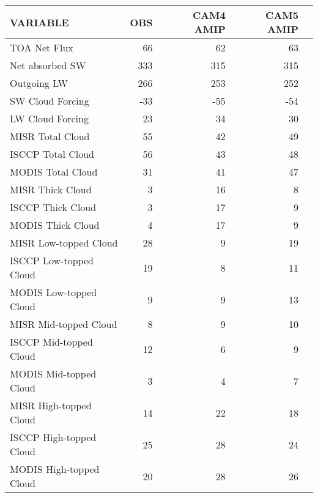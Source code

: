 \begin{tabular}{lrrrr}
\hline
                VARIABLE &                      OBS &                CAM4 AMIP &                CAM5 AMIP \\ \hline
            TOA Net Flux &                       66 &                       62 &                       63 \\
         Net absorbed SW &                      333 &                      315 &                      315 \\
             Outgoing LW &                      266 &                      253 &                      252 \\
        SW Cloud Forcing &                      -33 &                      -55 &                      -54 \\
        LW Cloud Forcing &                       23 &                       34 &                       30 \\
        MISR Total Cloud &                       55 &                       42 &                       49 \\
       ISCCP Total Cloud &                       56 &                       43 &                       48 \\
       MODIS Total Cloud &                       31 &                       41 &                       47 \\
        MISR Thick Cloud &                        3 &                       16 &                        8 \\
       ISCCP Thick Cloud &                        3 &                       17 &                        9 \\
       MODIS Thick Cloud &                        4 &                       17 &                        9 \\
   MISR Low-topped Cloud &                       28 &                        9 &                       19 \\
  ISCCP Low-topped Cloud &                       19 &                        8 &                       11 \\
  MODIS Low-topped Cloud &                        9 &                        9 &                       13 \\
   MISR Mid-topped Cloud &                        8 &                        9 &                       10 \\
  ISCCP Mid-topped Cloud &                       12 &                        6 &                        9 \\
  MODIS Mid-topped Cloud &                        3 &                        4 &                        7 \\
  MISR High-topped Cloud &                       14 &                       22 &                       18 \\
 ISCCP High-topped Cloud &                       25 &                       28 &                       24 \\
 MODIS High-topped Cloud &                       20 &                       28 &                       26 \\ \hline
\end{tabular}
